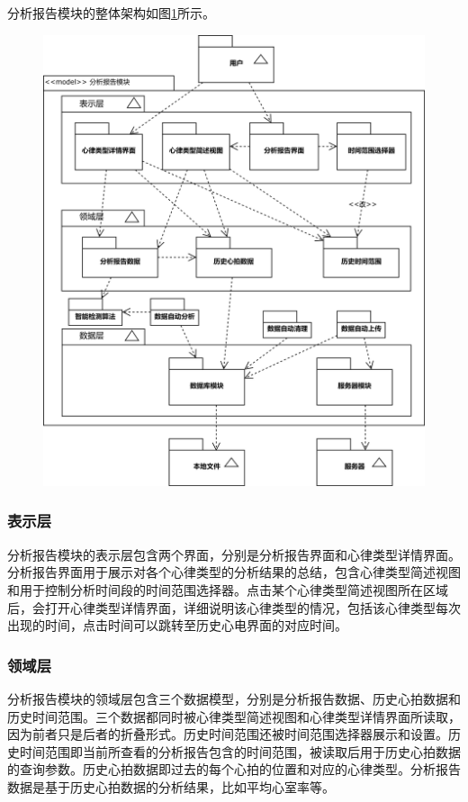 分析报告模块的整体架构如图\ref{fig:model-analytics}所示。

\begin{figure}[ht]
    \centering
    \includegraphics[width=.8\textwidth]{../assets/model-analytics.drawio}
    \label{fig:model-analytics}
\end{figure}

\subsubsection{表示层}

分析报告模块的表示层包含两个界面，分别是分析报告界面和心律类型详情界面。分析报告界面用于展示对各个心律类型的分析结果的总结，包含心律类型简述视图和用于控制分析时间段的时间范围选择器。点击某个心律类型简述视图所在区域后，会打开心律类型详情界面，详细说明该心律类型的情况，包括该心律类型每次出现的时间，点击时间可以跳转至历史心电界面的对应时间。

\subsubsection{领域层}

分析报告模块的领域层包含三个数据模型，分别是分析报告数据、历史心拍数据和历史时间范围。三个数据都同时被心律类型简述视图和心律类型详情界面所读取，因为前者只是后者的折叠形式。历史时间范围还被时间范围选择器展示和设置。历史时间范围即当前所查看的分析报告包含的时间范围，被读取后用于历史心拍数据的查询参数。历史心拍数据即过去的每个心拍的位置和对应的心律类型。分析报告数据是基于历史心拍数据的分析结果，比如平均心室率等。

